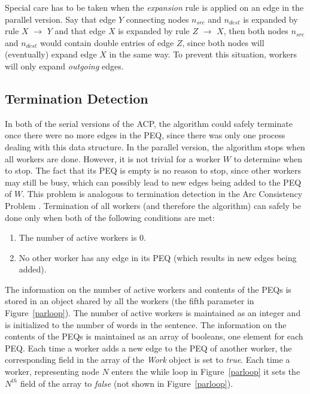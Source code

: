 Special care has to be taken when the {\em expansion} rule is applied
on an edge in the parallel version. Say that edge $Y$ connecting nodes
$n_{src}$ and $n_{dest}$ is expanded by rule $X$ {$\rightarrow$} $Y$ and
that edge $X$ is expanded by rule $Z$ {$\rightarrow$} $X$, then both
nodes $n_{src}$ and $n_{dest}$ would contain double entries of edge
$Z$, since both nodes will (eventually) expand edge $X$ in the same
way. To prevent this situation, workers will only expand {\em
outgoing} edges.


\subsection{Termination Detection}

In both of the serial versions of the ACP, the algorithm could safely
terminate once there were no more edges in the PEQ,
since there was only one process dealing with this data structure. 
In the parallel version, the algorithm stops when all workers are
done. However, it is not trivial for a worker $W$ to determine when to
stop. The fact that its PEQ is empty is no reason to
stop, since other workers may still be busy, which can possibly lead
to new edges being added to the PEQ of $W$. This
problem is analogous to termination detection in the Arc
Consistency Problem \cite {acp}. Termination of all workers (and
therefore the algorithm) can safely be done only when both of the following
conditions are met:

\begin{enumerate}

\item
The number of active workers is 0.

\item
No other worker has any edge in its PEQ (which
results in new edges being added).

\end{enumerate}

The information on the number of active workers and contents of the
PEQs is stored in an object shared by all the workers
(the fifth parameter in Figure~\ref{parloop}). The number of active
workers is maintained as an integer and is initialized to the number
of words in the sentence. The information on the contents of the
PEQs is maintained as an array of booleans, one
element for each PEQ. Each time a worker 
adds a new edge to the PEQ of another worker, the
corresponding field in the array of the {\em Work} object is set to
{\em true}. Each time a worker, representing node $N$ enters the while loop in
Figure~\ref{parloop} it sets the $N^{th}$ field of the array to {\em
false} (not shown in Figure~\ref{parloop}).

